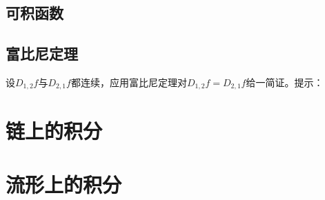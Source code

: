 \section{可积函数}\label{section0090303}


\section{富比尼定理}\label{section0090304}

\begin{problemset}
\item\label{exer009030328} 设$D_{1,2}f$与$D_{2,1}f$都连续，应用富比尼定理对$D_{1,2}f = D_{2,1}f$给一简证。提示：

\end{problemset}



\chapter{链上的积分}\label{chapter00904}




\chapter{流形上的积分}\label{chapter00905}

